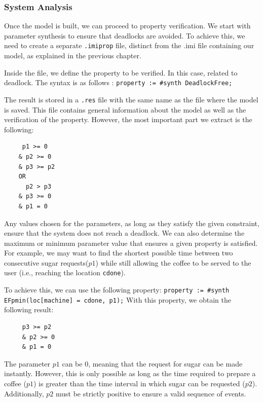 \subsubsection{System Analysis}

Once the model is built, we can proceed to property verification. We start with parameter synthesis to ensure that deadlocks are avoided. To achieve this, we need to create a separate \texttt{.imiprop} file, distinct from the .imi file containing our model, as explained in the previous chapter.


Inside the file, we define the property to be verified. In this case, related to deadlock. The syntax is as follows : \texttt{property := \#synth DeadlockFree;}

The result is stored in a \texttt{.res} file with the same name as the file where the model is saved. This file contains general information about the model as well as the verification of the property. However, the most important part we extract is the following:

\begin{verbatim}
     p1 >= 0
    & p2 >= 0
    & p3 >= p2
    OR
      p2 > p3
    & p3 >= 0
    & p1 = 0
\end{verbatim}

Any values chosen for the parameters, as long as they satisfy the given constraint, ensure that the system does not reach a deadlock. We can also determine the maximum or minimum parameter value that ensures a given property is satisfied. For example, we may want to find the shortest possible time between two consecutive sugar requests(\( p1 \)) while still allowing the coffee to be served to the user (i.e., reaching the location \texttt{cdone}).

To achieve this, we can use the following property: 
\texttt{property := \#synth EFpmin(loc[machine] = cdone, p1);} With this property, we obtain the following result:

\begin{verbatim}
     p3 >= p2
     & p2 >= 0
     & p1 = 0
\end{verbatim}

The parameter \( p1 \) can be 0, meaning that the request for sugar can be made instantly. However, this is only possible as long as the time required to prepare a coffee (\( p1 \)) is greater than the time interval in which sugar can be requested (\( p2 \)). Additionally, \( p2 \) must be strictly positive to ensure a valid sequence of events.

